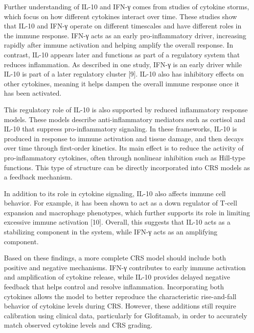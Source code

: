 \documentclass[11pt]{article}
\begin{document}
Further understanding of IL-10 and IFN-γ comes from studies of cytokine storms, which focus on how different cytokines interact over time. These studies show that IL-10 and IFN-γ operate on different timescales and have different roles in the immune response. IFN-γ acts as an early pro-inflammatory driver, increasing rapidly after immune activation and helping amplify the overall response. In contrast, IL-10 appears later and functions as part of a regulatory system that reduces inflammation. As described in one study, IFN-γ is an early driver while IL-10 is part of a later regulatory cluster [9]. IL-10 also has inhibitory effects on other cytokines, meaning it helps dampen the overall immune response once it has been activated.
\par\medskip

This regulatory role of IL-10 is also supported by reduced inflammatory response models. These models describe anti-inflammatory mediators such as cortisol and IL-10 that suppress pro-inflammatory signaling. In these frameworks, IL-10 is produced in response to immune activation and tissue damage, and then decays over time through first-order kinetics. Its main effect is to reduce the activity of pro-inflammatory cytokines, often through nonlinear inhibition such as Hill-type functions. This type of structure can be directly incorporated into CRS models as a feedback mechanism.
\par\medskip

In addition to its role in cytokine signaling, IL-10 also affects immune cell behavior. For example, it has been shown to act as a down regulator of T-cell expansion and macrophage phenotypes, which further supports its role in limiting excessive immune activation [10]. Overall, this suggests that IL-10 acts as a stabilizing component in the system, while IFN-γ acts as an amplifying component.
\par\medskip

Based on these findings, a more complete CRS model should include both positive and negative mechanisms. IFN-γ contributes to early immune activation and amplification of cytokine release, while IL-10 provides delayed negative feedback that helps control and resolve inflammation. Incorporating both cytokines allows the model to better reproduce the characteristic rise-and-fall behavior of cytokine levels during CRS. However, these additions still require calibration using clinical data, particularly for Glofitamab, in order to accurately match observed cytokine levels and CRS grading.
\par\medskip
\end{document}
